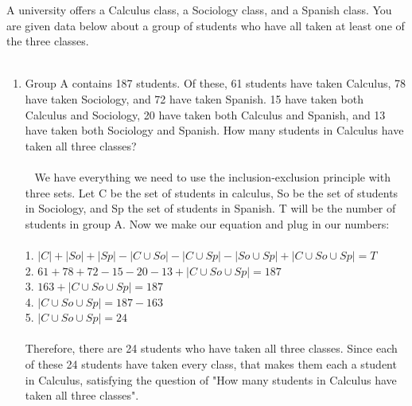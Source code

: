 \documentclass{amsart}
\theoremstyle{definition}
\theoremstyle{Exercise}
\theoremstyle{remark}
\theoremstyle{rule}
\numberwithin{equation}{section}
\begin{document}
\item
A university offers a Calculus class, a Sociology class, and a Spanish class. You are given data below about a group of students who have all taken at least one of the three classes.\\\\
     \begin{enumerate}[label=(\roman*)]
     \item Group A contains 187 students. Of these, 61 students have taken Calculus, 78 have taken Sociology, and 72 have taken Spanish. 15 have taken both Calculus and Sociology, 20 have taken both Calculus and Spanish, and 13 have taken both Sociology and Spanish. How many students in Calculus have taken all three classes?\\\\\
We have everything we need to use the inclusion-exclusion principle with three sets. Let C be the set of students in calculus, So be the set of students in Sociology, and Sp the set of students in Spanish. T will be the number of students in group A. Now we make our equation and plug in our numbers:\\\\
1. $|C| + |So| + |Sp| - |C \cup So| - |C \cup Sp| - |So \cup Sp| + |C \cup So \cup Sp| = T$\\
2. $61 + 78 + 72 - 15 - 20 - 13 + |C \cup So \cup Sp| = 187$\\
3. $163 + |C \cup So \cup Sp| = 187$\\
4. $|C \cup So \cup Sp| = 187 - 163$\\
5. $|C \cup So \cup Sp| = 24$\\\\
Therefore, there are 24 students who have taken all three classes. Since each of these 24 students have taken every class, that makes them each a student in Calculus, satisfying the question of "How many students in Calculus have taken all three classes".
\\\\\
   

\end{enumerate}
\end{document}
